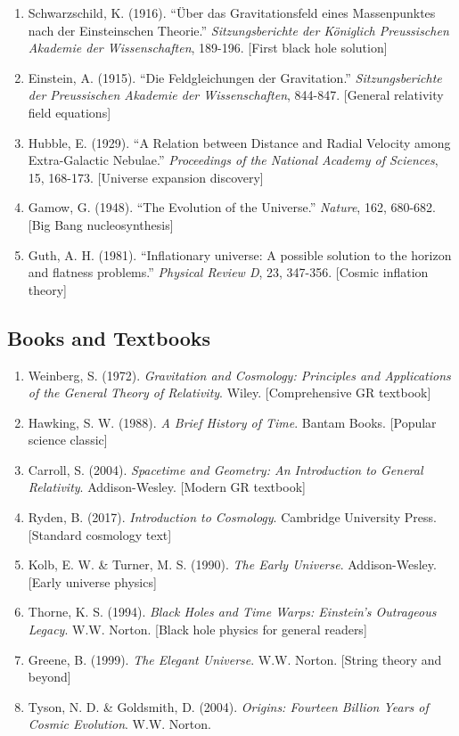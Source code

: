 \documentclass[11pt,a4paper]{article}
\begin{document}
\begin{enumerate}[noitemsep]
    \item Schwarzschild, K. (1916). ``Über das Gravitationsfeld eines Massenpunktes nach der Einsteinschen Theorie.'' \textit{Sitzungsberichte der Königlich Preussischen Akademie der Wissenschaften}, 189-196. [First black hole solution]
    \item Einstein, A. (1915). ``Die Feldgleichungen der Gravitation.'' \textit{Sitzungsberichte der Preussischen Akademie der Wissenschaften}, 844-847. [General relativity field equations]
    \item Hubble, E. (1929). ``A Relation between Distance and Radial Velocity among Extra-Galactic Nebulae.'' \textit{Proceedings of the National Academy of Sciences}, 15, 168-173. [Universe expansion discovery]
    \item Gamow, G. (1948). ``The Evolution of the Universe.'' \textit{Nature}, 162, 680-682. [Big Bang nucleosynthesis]
    \item Guth, A. H. (1981). ``Inflationary universe: A possible solution to the horizon and flatness problems.'' \textit{Physical Review D}, 23, 347-356. [Cosmic inflation theory]
\end{enumerate}

\subsection{Books and Textbooks}
\begin{enumerate}[noitemsep]
    \item Weinberg, S. (1972). \textit{Gravitation and Cosmology: Principles and Applications of the General Theory of Relativity}. Wiley. [Comprehensive GR textbook]
    \item Hawking, S. W. (1988). \textit{A Brief History of Time}. Bantam Books. [Popular science classic]
    \item Carroll, S. (2004). \textit{Spacetime and Geometry: An Introduction to General Relativity}. Addison-Wesley. [Modern GR textbook]
    \item Ryden, B. (2017). \textit{Introduction to Cosmology}. Cambridge University Press. [Standard cosmology text]
    \item Kolb, E. W. \& Turner, M. S. (1990). \textit{The Early Universe}. Addison-Wesley. [Early universe physics]
    \item Thorne, K. S. (1994). \textit{Black Holes and Time Warps: Einstein's Outrageous Legacy}. W.W. Norton. [Black hole physics for general readers]
    \item Greene, B. (1999). \textit{The Elegant Universe}. W.W. Norton. [String theory and beyond]
    \item Tyson, N. D. \& Goldsmith, D. (2004). \textit{Origins: Fourteen Billion Years of Cosmic Evolution}. W.W. Norton.
\end{enumerate}
\end{document}
